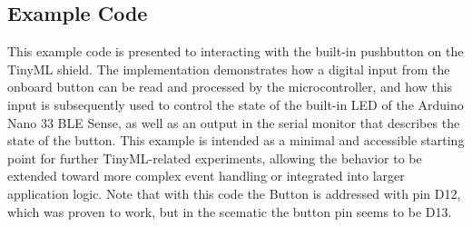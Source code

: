 \subsection{Example Code} \label{ExampleCodePB}
This example code is presented to interacting with the built-in pushbutton on the TinyML shield. The implementation demonstrates how a digital input from the onboard button can be read and processed by the microcontroller, and how this input is subsequently used to control the state of the built-in LED of the Arduino Nano 33 BLE Sense, as well as an output in the serial monitor that describes the state of the button. This example is intended as a minimal and accessible starting point for further TinyML-related experiments, allowing the behavior to be extended toward more complex event handling or integrated into larger application logic. Note that with this code the Button is addressed with pin D12, which was proven to work, but in the scematic the button pin seems to be D13.


\begin{center}
	
	\label{lst:PushButtonTest}
\end{center}

